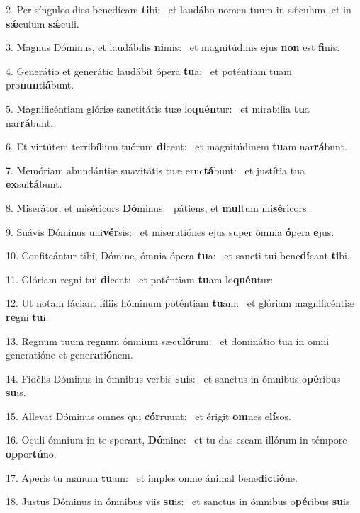 2. Per síngulos dies benedícam \textbf{ti}bi: \ast\  et laudábo nomen tuum in sǽculum, et in \textbf{sǽ}culum \textbf{sǽ}culi.\

3. Magnus Dóminus, et laudábilis \textbf{ni}mis: \ast\  et magnitúdinis ejus \textbf{non} est \textbf{fi}nis.\

4. Generátio et generátio laudábit ópera \textbf{tu}a: \ast\  et poténtiam tuam pro\textbf{nun}ti\textbf{á}bunt.\

5. Magnificéntiam glóriæ sanctitátis tuæ lo\textbf{quén}tur: \ast\  et mirabília \textbf{tu}a nar\textbf{rá}bunt.\

6. Et virtútem terribílium tuórum \textbf{di}cent: \ast\  et magnitúdinem \textbf{tu}am nar\textbf{rá}bunt.\

7. Memóriam abundántiæ suavitátis tuæ eruc\textbf{tá}bunt: \ast\  et justítia tua \textbf{ex}sul\textbf{tá}bunt.\

8. Miserátor, et miséricors \textbf{Dó}minus: \ast\  pátiens, et \textbf{mul}tum mi\textbf{sé}ricors.\

9. Suávis Dóminus uni\textbf{vér}sis: \ast\  et miseratiónes ejus super ómnia \textbf{ó}pera \textbf{e}jus.\

10. Confiteántur tibi, Dómine, ómnia ópera \textbf{tu}a: \ast\  et sancti tui bene\textbf{dí}cant \textbf{ti}bi.\

11. Glóriam regni tui \textbf{di}cent: \ast\  et poténtiam \textbf{tu}am lo\textbf{quén}tur:\

12. Ut notam fáciant fíliis hóminum poténtiam \textbf{tu}am: \ast\  et glóriam magnificéntiæ \textbf{re}gni \textbf{tu}i.\

13. Regnum tuum regnum ómnium sæcu\textbf{ló}rum: \ast\  et dominátio tua in omni generatióne et gene\textbf{ra}ti\textbf{ó}nem.\

14. Fidélis Dóminus in ómnibus verbis \textbf{su}is: \ast\  et sanctus in ómnibus o\textbf{pé}ribus \textbf{su}is.\

15. Allevat Dóminus omnes qui \textbf{cór}ruunt: \ast\  et érigit \textbf{om}nes e\textbf{lí}sos.\

16. Oculi ómnium in te sperant, \textbf{Dó}mine: \ast\  et tu das escam illórum in témpore \textbf{op}por\textbf{tú}no.\

17. Aperis tu manum \textbf{tu}am: \ast\  et imples omne ánimal bene\textbf{dic}ti\textbf{ó}ne.\

18. Justus Dóminus in ómnibus viis \textbf{su}is: \ast\  et sanctus in ómnibus o\textbf{pé}ribus \textbf{su}is.\

